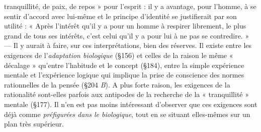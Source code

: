 tranquillité, de paix, de repos » pour l'esprit : il y a avantage, pour
l’homme, à se sentir d’accord avec lui-même et le principe d'identité
se justifierait par son utilité : « Après l'intérêt qu’il y a pour un homme
à respirer librement, le plus grand de tous ses intérêts, c’est celui
qu’il y a pour lui à ne pas se contredire. » — Il y aurait à faire, sur
ces interprétations, bien des réserves. Il existe entre les exigences de
l'{\it adaptation biologique} (\S 156) et celles de la raison le même « décalage » qu’entre l’habitude et le concept (\S 184), entre la simple expérience mentale et l’expérience logique qui implique la prise de conscience des normes rationnelles de la pensée (\S 204 {\it B}). A plus forte
raison, les exigences de la rationalité sont-elles parfois aux antipodes
de la recherche de la « tranquillité » mentale (\S 177). Il n’en est pas
moins intéressant d’observer que ces exigences sont déjà comme
{\it préfigurées dans le biologique}, tout en se situant elles-mêmes sur un
plan très supérieur.

